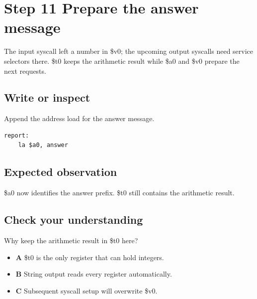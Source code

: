 \section{Step 11 Prepare the answer
  message}\label{001-console-calculation-s11-step-11-prepare-the-answer-message}

The input syscall left a number in \$v0; the upcoming output syscalls
need service selectors there. \$t0 keeps the arithmetic result while
\$a0 and \$v0 prepare the next requests.

\subsection{Write or
  inspect}\label{001-console-calculation-s11-write-or-inspect}

Append the address load for the answer message.

\begin{verbatim}
report:
    la $a0, answer
\end{verbatim}

\subsection{Expected
  observation}\label{001-console-calculation-s11-expected-observation}

\$a0 now identifies the answer prefix. \$t0 still contains the
arithmetic result.

\subsection{Check your
  understanding}\label{001-console-calculation-s11-check-your-understanding}

Why keep the arithmetic result in \$t0 here?

\begin{itemize}
  \tightlist
  \item
        \textbf{A} \$t0 is the only register that can hold integers.
  \item
        \textbf{B} String output reads every register automatically.
  \item
        \textbf{C} Subsequent syscall setup will overwrite \$v0.
\end{itemize}

